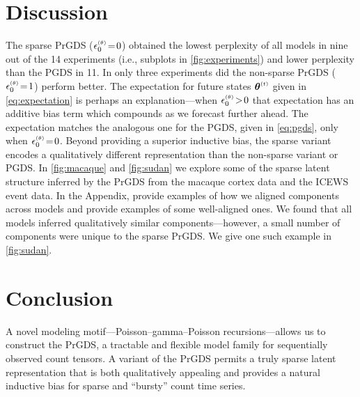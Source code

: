 \documentclass{article}
\begin{document}
\section{Discussion}
The sparse PrGDS ($\epstheta \teq 0$) obtained the lowest perplexity of all models in nine out of the 14 experiments (i.e., subplots in \cref{fig:experiments}) and lower perplexity than the PGDS in 11. In only three experiments did the non-sparse PrGDS ($\epstheta \teq 1$) perform better. The expectation for future states $\boldsymbol{\theta}^{\mathsmaller{(t)}}$ given in \cref{eq:expectation} is perhaps an explanation---when $\epstheta \!>\! 0$ that expectation has an additive bias term which compounds as we forecast further ahead. The expectation matches the analogous one for the PGDS, given in \cref{eq:pgds}, only when $\epstheta \teq 0$. Beyond providing a superior inductive bias, the sparse variant encodes a qualitatively different representation than the non-sparse variant or PGDS. In \cref{fig:macaque} and \cref{fig:sudan} we explore some of the sparse latent structure inferred by the PrGDS from the macaque cortex data and the ICEWS event data. In the Appendix, provide examples of how we aligned components across models and provide examples of some well-aligned ones. We found that all models inferred qualitatively similar components---however, a small number of components were unique to the sparse PrGDS. We give one such example in \cref{fig:sudan}.

\vfill
\section{Conclusion} A novel modeling motif---Poisson--gamma--Poisson recursions---allows us to construct the PrGDS, a tractable and flexible model family for sequentially observed count tensors. A variant of the PrGDS permits a truly sparse latent representation that is both qualitatively appealing and provides a natural inductive bias for sparse and ``bursty'' count time series.
\end{document}
